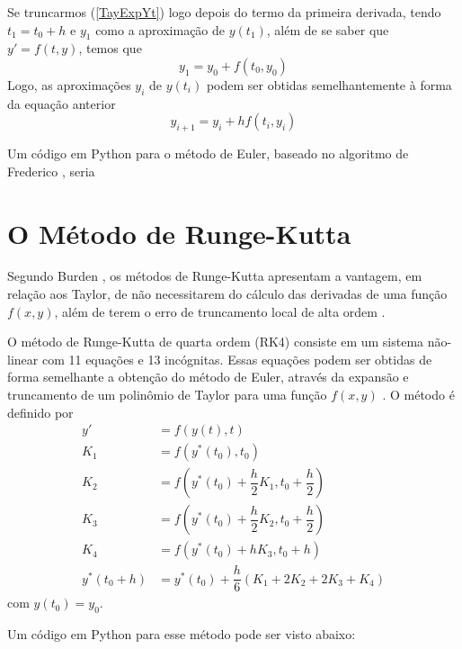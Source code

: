         Se truncarmos (\ref{TayExpYt}) logo depois do termo da primeira derivada, tendo $t_1 = t_0 + h$ e $y_1$ como a aproximação
        de $y(t_1)$, além de se saber que $y' = f(t, y)$, temos que
        \begin{equation*}
            y_1 = y_0 + f(t_0, y_0)
        \end{equation*}
        Logo, as aproximações $y_i$ de $y(t_i)$ podem ser obtidas semelhantemente à forma da equação anterior \cite{fred}
        \begin{equation}
            y_{i+1} = y_i + hf(t_i, y_i) 
        \end{equation}
        
        Um código em Python para o método de Euler, baseado no algoritmo de Frederico \cite{fred}, seria
        
    
    \section{O Método de Runge-Kutta}
    
        Segundo Burden \cite{burden}, os métodos de Runge-Kutta apresentam a vantagem, em relação aos Taylor, de não necessitarem do cálculo das derivadas de
        uma função $f(x, y)$, além de terem o erro de truncamento local de alta ordem .

        O método de Runge-Kutta de quarta ordem (RK4) consiste em um sistema não-linear com 11 equações e 13 incógnitas. Essas equações podem ser obtidas de forma semelhante a obtenção do método de Euler, através da expansão e truncamento de um polinômio de Taylor para uma função $f(x, y)$ \cite{fred}. O método é definido por
        \begin{align}
            y' &= f(y(t), t) \\%
            K_1 &= f(y^*(t_0), t_0) \\
            K_2 &= f(y^*(t_0) + \dfrac{h}{2}K_1, t_0 + \dfrac{h}{2}) \\
            K_3 &= f(y^*(t_0) + \dfrac{h}{2}K_2, t_0 + \dfrac{h}{2}) \\
            K_4 &= f(y^*(t_0) + hK_3, t_0 + h) \\
            y^*(t_0 + h) &= y^*(t_0) + \dfrac{h}{6}(K_1 + 2K_2 + 2K_3 + K_4)
        \end{align}
        com $y(t_0) = y_0$.
        
        Um código em Python para esse método pode ser visto abaixo:
        
        
